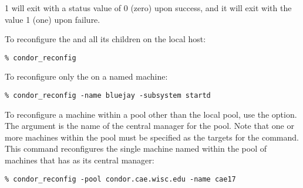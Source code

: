 \begin{ManPage}{\label{man-condor-reconfig}}{1}
 will exit with a status value of 0 (zero) upon success,
and it will exit with the value 1 (one) upon failure.

\Examples
To reconfigure the  and all its children
on the local host:
\begin{verbatim}
% condor_reconfig
\end{verbatim}

To reconfigure only the  on a named machine:
\begin{verbatim}
% condor_reconfig -name bluejay -subsystem startd
\end{verbatim}

To reconfigure a machine within a pool
other than the local pool, use the  option.
The argument is the name of the central manager for the pool.
Note that one or more machines within the pool must be
specified as the targets for the command.
This command reconfigures
the single machine named  within the
pool of machines that has  as
its central manager:
\begin{verbatim}
% condor_reconfig -pool condor.cae.wisc.edu -name cae17
\end{verbatim}

\end{ManPage}
